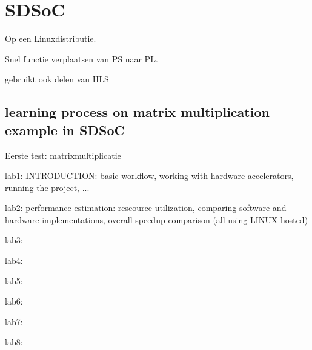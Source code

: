 \section{SDSoC}

Op een Linuxdistributie.

Snel functie verplaatsen van PS naar PL.

gebruikt ook delen van HLS

\subsection{learning process on matrix multiplication example in SDSoC}

Eerste test: matrixmultiplicatie

lab1: INTRODUCTION: basic workflow, working with hardware accelerators, running the project, ...

lab2: performance estimation: rescource utilization, comparing software and hardware implementations, overall speedup comparison (all using LINUX hosted)

lab3: 

lab4:

lab5:

lab6:

lab7:

lab8:
